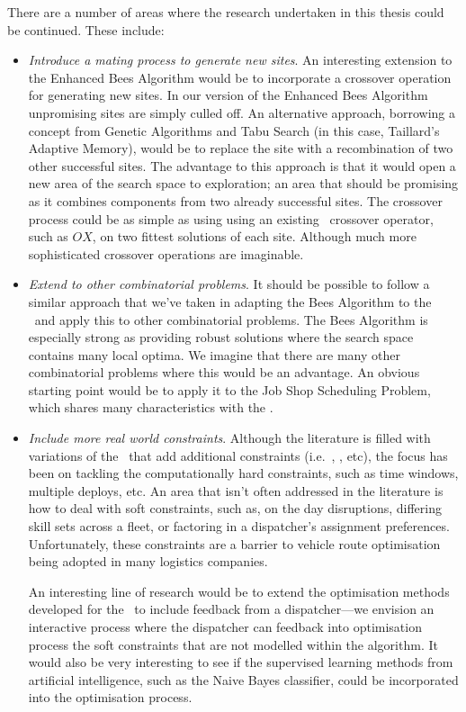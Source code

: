 There are a number of areas where the research undertaken in this thesis could be continued. These include:

\begin{itemize}

   \item \emph{Introduce a mating process to generate new sites}. An interesting extension to the Enhanced Bees Algorithm would be to incorporate a crossover operation for generating new sites. In our version of the Enhanced Bees Algorithm unpromising sites are simply culled off. An alternative approach, borrowing a concept from Genetic Algorithms and Tabu Search (in this case, Taillard's Adaptive Memory), would be to replace the site with a recombination of two other successful sites. The advantage to this approach is that it would open a new area of the search space to exploration; an area that should be promising as it combines components from two already successful sites. The crossover process could be as simple as using using an existing \VRP\ crossover operator, such as $OX$, on two fittest solutions of each site. Although much more sophisticated crossover operations are imaginable.

   \item \emph{Extend to other combinatorial problems}. It should be possible to follow a similar approach that we've taken in adapting the Bees Algorithm to the \VRP\ and apply this to other combinatorial problems. The Bees Algorithm is especially strong as providing robust solutions where the search space contains many local optima. We imagine that there are many other combinatorial problems where this would be an advantage. An obvious starting point would be to apply it to the Job Shop Scheduling Problem, which shares many characteristics with the \VRP.

   \item \emph{Include more real world constraints}. Although the literature is filled with variations of the \VRP\ that add additional constraints (i.e.~\VRPTW, \PDP, etc), the focus has been on tackling the computationally hard constraints, such as time windows, multiple deploys, etc. An area that isn't often addressed in the literature is how to deal with soft constraints, such as, on the day disruptions, differing skill sets across a fleet, or factoring in a dispatcher's assignment preferences. Unfortunately, these constraints are a barrier to vehicle route optimisation being adopted in many logistics companies. 
   
   An interesting line of research would be to extend the optimisation methods developed for the \VRP\ to include feedback from a dispatcher---we envision an interactive process where the dispatcher can feedback into optimisation process the soft constraints that are not modelled within the algorithm. It would also be very interesting to see if the supervised learning methods from artificial intelligence, such as the Naive Bayes classifier, could be incorporated into the optimisation process.
      
\end{itemize}

